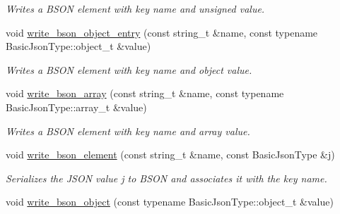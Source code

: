 \begin{DoxyCompactItemize}
\begin{DoxyCompactList}\small\item\em Writes a B\+S\+ON element with key {\itshape name} and unsigned {\itshape value}. \end{DoxyCompactList}\item 
\mbox{\label{classnlohmann_1_1detail_1_1binary__writer_a6231302930265eccb3f56c378f7b0661}} 
void \mbox{\hyperlink{classnlohmann_1_1detail_1_1binary__writer_a6231302930265eccb3f56c378f7b0661}{write\+\_\+bson\+\_\+object\+\_\+entry}} (const string\+\_\+t \&name, const typename Basic\+Json\+Type\+::object\+\_\+t \&value)
\begin{DoxyCompactList}\small\item\em Writes a B\+S\+ON element with key {\itshape name} and object {\itshape value}. \end{DoxyCompactList}\item 
\mbox{\label{classnlohmann_1_1detail_1_1binary__writer_a025212bd170253638b9f05b3b6aa5bf9}} 
void \mbox{\hyperlink{classnlohmann_1_1detail_1_1binary__writer_a025212bd170253638b9f05b3b6aa5bf9}{write\+\_\+bson\+\_\+array}} (const string\+\_\+t \&name, const typename Basic\+Json\+Type\+::array\+\_\+t \&value)
\begin{DoxyCompactList}\small\item\em Writes a B\+S\+ON element with key {\itshape name} and array {\itshape value}. \end{DoxyCompactList}\item 
void \mbox{\hyperlink{classnlohmann_1_1detail_1_1binary__writer_a7ff58bf1a80018148bed860667ffca07}{write\+\_\+bson\+\_\+element}} (const string\+\_\+t \&name, const Basic\+Json\+Type \&j)
\begin{DoxyCompactList}\small\item\em Serializes the J\+S\+ON value {\itshape j} to B\+S\+ON and associates it with the key {\itshape name}. \end{DoxyCompactList}\item 
void \mbox{\hyperlink{classnlohmann_1_1detail_1_1binary__writer_a29b3e0f83a8e5f2307804023109ba2c9}{write\+\_\+bson\+\_\+object}} (const typename Basic\+Json\+Type\+::object\+\_\+t \&value)
\item 
\mbox{\label{classnlohmann_1_1detail_1_1binary__writer_a0ea6745f944c0c61672146886b4ee90f}} 

\end{DoxyCompactItemize}
